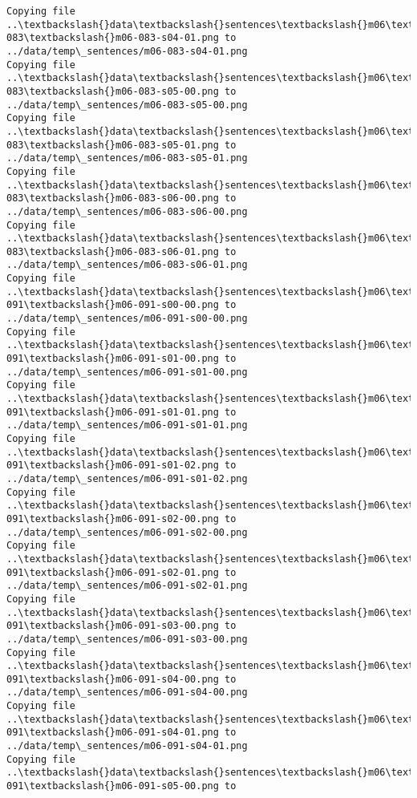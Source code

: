 \documentclass[11pt]{article}
\begin{document}
\begin{Verbatim}[commandchars=\\\{\}]
Copying file ..\textbackslash{}data\textbackslash{}sentences\textbackslash{}m06\textbackslash{}m06-083\textbackslash{}m06-083-s04-01.png to
../data/temp\_sentences/m06-083-s04-01.png
Copying file ..\textbackslash{}data\textbackslash{}sentences\textbackslash{}m06\textbackslash{}m06-083\textbackslash{}m06-083-s05-00.png to
../data/temp\_sentences/m06-083-s05-00.png
Copying file ..\textbackslash{}data\textbackslash{}sentences\textbackslash{}m06\textbackslash{}m06-083\textbackslash{}m06-083-s05-01.png to
../data/temp\_sentences/m06-083-s05-01.png
Copying file ..\textbackslash{}data\textbackslash{}sentences\textbackslash{}m06\textbackslash{}m06-083\textbackslash{}m06-083-s06-00.png to
../data/temp\_sentences/m06-083-s06-00.png
Copying file ..\textbackslash{}data\textbackslash{}sentences\textbackslash{}m06\textbackslash{}m06-083\textbackslash{}m06-083-s06-01.png to
../data/temp\_sentences/m06-083-s06-01.png
Copying file ..\textbackslash{}data\textbackslash{}sentences\textbackslash{}m06\textbackslash{}m06-091\textbackslash{}m06-091-s00-00.png to
../data/temp\_sentences/m06-091-s00-00.png
Copying file ..\textbackslash{}data\textbackslash{}sentences\textbackslash{}m06\textbackslash{}m06-091\textbackslash{}m06-091-s01-00.png to
../data/temp\_sentences/m06-091-s01-00.png
Copying file ..\textbackslash{}data\textbackslash{}sentences\textbackslash{}m06\textbackslash{}m06-091\textbackslash{}m06-091-s01-01.png to
../data/temp\_sentences/m06-091-s01-01.png
Copying file ..\textbackslash{}data\textbackslash{}sentences\textbackslash{}m06\textbackslash{}m06-091\textbackslash{}m06-091-s01-02.png to
../data/temp\_sentences/m06-091-s01-02.png
Copying file ..\textbackslash{}data\textbackslash{}sentences\textbackslash{}m06\textbackslash{}m06-091\textbackslash{}m06-091-s02-00.png to
../data/temp\_sentences/m06-091-s02-00.png
Copying file ..\textbackslash{}data\textbackslash{}sentences\textbackslash{}m06\textbackslash{}m06-091\textbackslash{}m06-091-s02-01.png to
../data/temp\_sentences/m06-091-s02-01.png
Copying file ..\textbackslash{}data\textbackslash{}sentences\textbackslash{}m06\textbackslash{}m06-091\textbackslash{}m06-091-s03-00.png to
../data/temp\_sentences/m06-091-s03-00.png
Copying file ..\textbackslash{}data\textbackslash{}sentences\textbackslash{}m06\textbackslash{}m06-091\textbackslash{}m06-091-s04-00.png to
../data/temp\_sentences/m06-091-s04-00.png
Copying file ..\textbackslash{}data\textbackslash{}sentences\textbackslash{}m06\textbackslash{}m06-091\textbackslash{}m06-091-s04-01.png to
../data/temp\_sentences/m06-091-s04-01.png
Copying file ..\textbackslash{}data\textbackslash{}sentences\textbackslash{}m06\textbackslash{}m06-091\textbackslash{}m06-091-s05-00.png to

\end{Verbatim}
\end{document}
